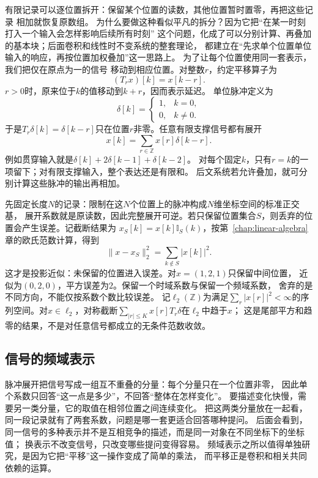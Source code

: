 有限记录可以逐位置拆开：保留某个位置的读数，其他位置暂时置零，再把这些记录
相加就恢复原数组。
为什么要做这种看似平凡的拆分？因为它把“在某一时刻打入一个输入会怎样影响后续所有时刻”
这个问题，化成了可以分别计算、再叠加的基本块；后面卷积和线性时不变系统的整套理论，
都建立在“先求单个位置单位输入的响应，再按位置加权叠加”这一思路上。
为了让每个位置使用同一套表示，我们把仅在原点为一的信号
移动到相应位置。对整数$r$，约定平移算子为
\[
  (T_rx)[k]=x[k-r].
\]
$r>0$时，原来位于$k$的值移动到$k+r$，因而表示延迟。
单位脉冲定义为
\[
  \delta[k]=
  \begin{cases}
    1,&k=0,\\
    0,&k\neq0.
  \end{cases}
\]
于是$T_r\delta[k]=\delta[k-r]$只在位置$r$非零。任意有限支撑信号都有展开
\begin{equation}
  x[k]=\sum_{r\in\mathbb Z}x[r]\delta[k-r].
  \label{eq:signal-analysis-impulse-expansion}
\end{equation}
例如贯穿输入就是$\delta[k]+2\delta[k-1]+\delta[k-2]$。
对每个固定$k$，只有$r=k$的一项留下；对有限支撑输入，整个表达还是有限和。
后文系统若允许叠加，就可分别计算这些脉冲的输出再相加。

先固定长度$N$的记录：限制在这$N$个位置上的脉冲构成$N$维坐标空间的标准正交基，
展开系数就是原读数，因此完整展开可逆。若只保留位置集合$S$，则丢弃的位置会产生误差。记截断结果为
$x_S[k]=x[k]\mathbb I_S(k)$，按第~\ref{chap:linear-algebra}章的欧氏范数计算，得到
\[
  \|x-x_S\|_2^2=\sum_{k\notin S}|x[k]|^2.
\]
这才是投影近似：未保留的位置进入误差。对$x=(1,2,1)$只保留中间位置，
近似为$(0,2,0)$，平方误差为$2$。保留一个时域系数与保留一个频域系数，
舍弃的是不同方向，不能仅按系数个数比较误差。
记$\ell_2(\mathbb Z)$为满足$\sum_r|x[r]|^2<\infty$的序列空间。对$x\in\ell_2$，对称截断$\sum_{|r|\leq K}x[r]T_r\delta$在$\ell_2$中趋于$x$；
这是尾部平方和趋零的结果，不是对任意信号都成立的无条件范数收敛。

\subsection{信号的频域表示}
\label{sec:signal-analysis-frequency-representation}

脉冲展开把信号写成一组互不重叠的分量：每个分量只在一个位置非零，
因此单个系数只回答“这一点是多少”，不回答“整体在怎样变化”。
要描述变化快慢，需要另一类分量，它的取值在相邻位置之间连续变化。
把这两类分量放在一起看，同一段记录就有了两套系数，问题是哪一套更适合回答哪种提问。
后面会看到，同一信号的多种表示并不是互相竞争的描述，而是同一对象在不同坐标下的坐标值；
换表示不改变信号，只改变哪些提问变得容易。
频域表示之所以值得单独研究，是因为它把“平移”这一操作变成了简单的乘法，
而平移正是卷积和相关共同依赖的运算。

